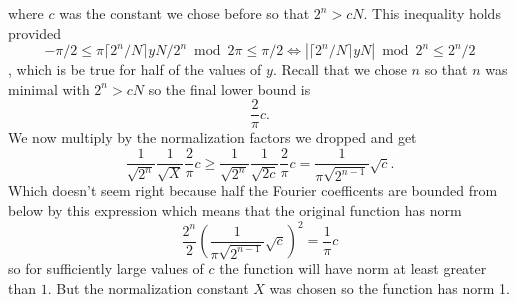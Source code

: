 \documentclass[10pt]{article}
\theoremstyle{plain}
\theoremstyle{definition}
\begin{document}
where \( c \) was the constant we chose before so that \( 2^n > cN \).
This inequality holds provided 
\[
-\pi / 2 \leq  \pi \lceil 2^n / N \rceil yN / 2^{n} \bmod{2\pi}   \leq \pi / 2 \Leftrightarrow \left| \lceil 2^n / N \rceil yN\right| \bmod{2^n} \leq 2^n/2
\]
, which is be true for half of the values of \( y \).
Recall that we chose \( n \) so that \( n \) was minimal with \( 2^n > cN \) so the final lower bound is
\[
    \frac{2}{\pi}c.
\]
We now multiply by the normalization factors we dropped and get
\[
    \frac{1}{\sqrt{2^n}}\frac{1}{\sqrt{X}}\frac{2}{\pi}c 
    \geq \frac{1}{\sqrt{2^n}}\frac{1}{\sqrt{2c}}\frac{2}{\pi}c 
    =\frac{1}{\pi\sqrt{2^{n-1}}}\sqrt{c}.
\]
Which doesn't seem right because half the Fourier coefficents are bounded from below by this expression which means that the original function has norm
\[
	\frac{2^n}{2}\left(\frac{1}{\pi\sqrt{2^{n-1}}}\sqrt{c} \right)^2
	=\frac{1}{\pi}c
\]
so for sufficiently large values of \( c \) the function will have norm at least greater than \( 1 \).
But the normalization constant \( X \) was chosen so the function has norm 1.
\end{document}
